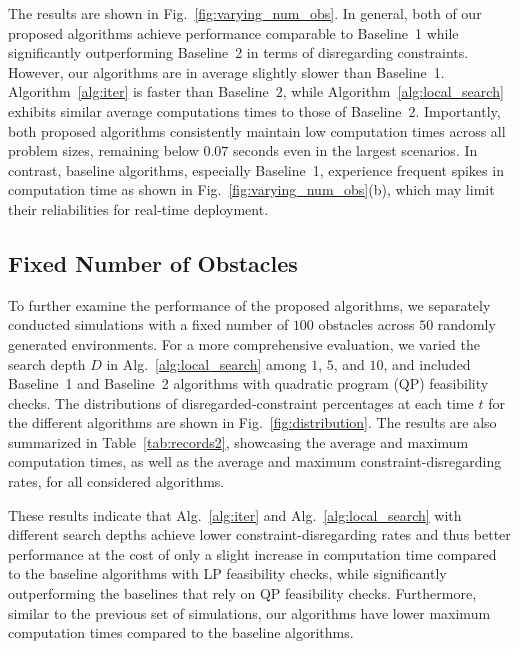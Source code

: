 \documentclass[letterpaper, 10 pt, conference]{ieeeconf}  %
\begin{document}
The results are shown in Fig.~\ref{fig:varying_num_obs}. In general, both of our proposed algorithms achieve performance comparable to Baseline~1 while significantly outperforming Baseline~2 in terms of disregarding constraints. However, our algorithms are in average slightly slower than Baseline~1. Algorithm~\ref{alg:iter} is faster than Baseline~$2$, while Algorithm~\ref{alg:local_search} exhibits similar average computations times to those of Baseline~2. Importantly, both proposed algorithms consistently maintain low computation times across all problem sizes, remaining below $0.07$ seconds even in the largest scenarios. In contrast, baseline algorithms, especially Baseline~1, experience frequent spikes in computation time as shown in Fig.~\ref{fig:varying_num_obs}(b), which may limit their reliabilities for real-time deployment.


\subsection{Fixed Number of Obstacles}

To further examine the performance of the proposed algorithms, we separately conducted simulations with a fixed number of $100$ obstacles across $50$ randomly generated environments. For a more comprehensive evaluation, we varied the search depth $D$ in Alg.~\ref{alg:local_search} among $1$, $5$, and $10$, and included Baseline~1 and Baseline~2 algorithms with quadratic program (QP) feasibility checks. The distributions of disregarded-constraint percentages at each time $t$ for the different algorithms are shown in Fig.~\ref{fig:distribution}. The results are also summarized in Table~\ref{tab:records2}, showcasing the average and maximum computation times, as well as the average and maximum constraint-disregarding rates, for all considered algorithms. 


 These results indicate that Alg.~\ref{alg:iter} and Alg.~\ref{alg:local_search} with different search depths achieve lower constraint-disregarding rates and thus better performance at the cost of only a slight increase in computation time compared to the baseline algorithms with LP feasibility checks, while significantly outperforming the baselines that rely on QP feasibility checks. Furthermore, similar to the previous set of simulations, our algorithms have lower maximum computation times compared to the baseline algorithms.
\end{document}
